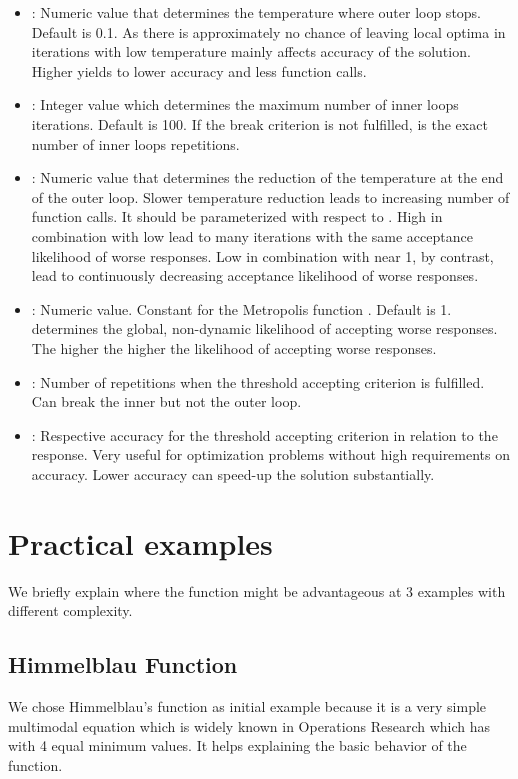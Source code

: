 \begin{itemize}
	\item {}: Numeric value that determines the temperature where outer loop stops. Default is 0.1. As there is approximately no chance of leaving local optima in iterations with low temperature  mainly affects accuracy of the solution. Higher  yields to lower accuracy and less function calls.
	\item {}: Integer value which determines the maximum number of inner loops iterations. Default is 100. If the break criterion  is not fulfilled,  is the exact number of inner loops repetitions.
	\item {}: Numeric value that determines the reduction of the temperature at the end of the outer loop. Slower temperature reduction leads to increasing number of function calls. It should be parameterized with respect to . High  in combination with low  lead to many iterations with the same acceptance likelihood of worse responses. Low  in combination with  near 1, by contrast, lead to continuously decreasing acceptance likelihood of worse responses.
	\item {}: Numeric value. Constant for the Metropolis function \citep{kirkpatrick_1983}. Default is 1.  determines the global, non-dynamic likelihood of accepting worse responses. The higher  the higher the likelihood of accepting worse responses.
	\item {}: Number of repetitions when the threshold accepting criterion is fulfilled. Can break the inner but not the outer loop.
	\item {}: Respective accuracy for the threshold accepting criterion in relation to the response. Very useful for optimization problems without high requirements on accuracy. Lower accuracy can speed-up the solution substantially.
\end{itemize}

\section{Practical examples}
We briefly explain where the  function might be advantageous at 3 examples with different complexity.
\subsection{Himmelblau Function}
We chose Himmelblau's function \citep{himmelblau_1972} as initial example because it is a very simple multimodal equation which is widely known in Operations Research which has with 4 equal minimum values. It helps explaining the basic behavior of the  function. 


